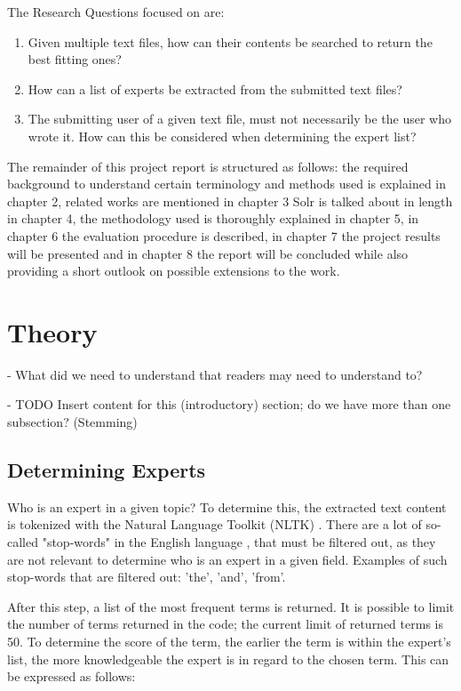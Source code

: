 \documentclass[a4paper,12pt]{article}
\begin{document}
The Research Questions focused on are:
\begin{enumerate}
\item Given multiple text files, how can their contents be searched to return the best fitting ones?  
\item How can a list of experts be extracted from the submitted text files?  
\item The submitting user of a given text file, must not necessarily be the user who wrote it. 
      How can this be considered when determining the expert list?
\end{enumerate}

The remainder of this project report is structured as follows: 
the required background to understand certain terminology and methods used is explained in chapter 2, 
related works are mentioned in chapter 3
Solr is talked about in length in chapter 4,
the methodology used is thoroughly explained in chapter 5, 
in chapter 6 the evaluation procedure is described, 
in chapter 7 the project results will be presented 
and in chapter 8 the report will be concluded while also providing a short outlook on possible extensions to the work.


\section{Theory} %
- What did we need to understand that readers may need to understand to?


- TODO Insert content for this (introductory) section; do we have more than one subsection? (Stemming)

\subsection{Determining Experts}
Who is an expert in a given topic?
To determine this, the extracted text content is tokenized with the Natural Language Toolkit (NLTK) \cite{nltk}.
There are a lot of so-called "stop-words" in the English language \cite{rajaraman_mining_2014}, that must be filtered out, as they are not relevant to determine who is an expert in a given field. 
Examples of such stop-words that are filtered out: 'the', 'and', 'from'. 

After this step, a list of the most frequent terms is returned. 
It is possible to limit the number of terms returned in the code; the current limit of returned terms is 50.
To determine the score of the term, the earlier the term is within the expert's list, the more knowledgeable the expert is in regard to the chosen term. 
This can be expressed as follows: 
\end{document}
